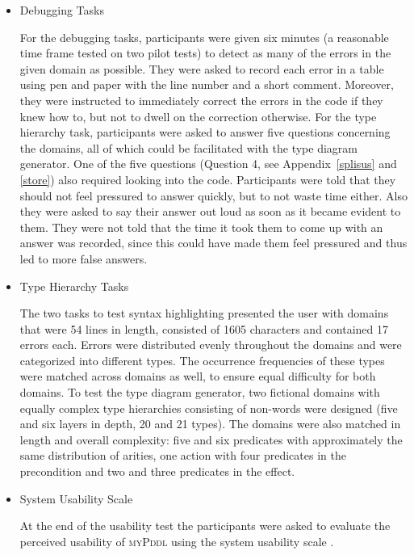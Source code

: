 \documentclass[runningheads]{llncs}
\newcommand{\mypddl}{\textsc{myPddl}\xspace}
\begin{document}
\begin{itemize}
\item Debugging Tasks

  For the debugging tasks, participants were given six minutes (a
  reasonable time frame tested on two pilot tests) to detect as many
  of the errors in the given domain as possible. They were asked to
  record each error in a table using pen and paper with the line
  number and a short comment. Moreover, they were instructed to
  immediately correct the errors in the code if they knew how to, but
  not to dwell on the correction otherwise. For the type hierarchy
  task, participants were asked to answer five questions concerning
  the domains, all of which could be facilitated with the type diagram
  generator. One of the five questions (Question 4, see
  Appendix~\ref{splisus} and \ref{store}) also required looking into
  the code. Participants were told that they should not feel pressured
  to answer quickly, but to not waste time either. Also they were
  asked to say their answer out loud as soon as it became evident to
  them. They were not told that the time it took them to come up with
  an answer was recorded, since this could have made them feel
  pressured and thus led to more false answers.

\item Type Hierarchy Tasks

  The two tasks to test syntax highlighting presented the user with
  domains that were 54 lines in length, consisted of 1605 characters
  and contained 17 errors each. Errors were distributed evenly
  throughout the domains and were categorized into different
  types. The occurrence frequencies of these types were matched across
  domains as well, to ensure equal difficulty for both domains. To
  test the type diagram generator, two fictional domains with equally
  complex type hierarchies consisting of non-words were designed (five
  and six layers in depth, 20 and 21 types). The domains were also
  matched in length and overall complexity: five and six predicates
  with approximately the same distribution of arities, one action with
  four predicates in the precondition and two and three predicates in
  the effect.

\item System Usability Scale

  At the end of the usability test the participants were asked to
  evaluate the perceived usability of \mypddl using the system
  usability scale \cite{brooke1996sus}.

\end{itemize}
\end{document}
